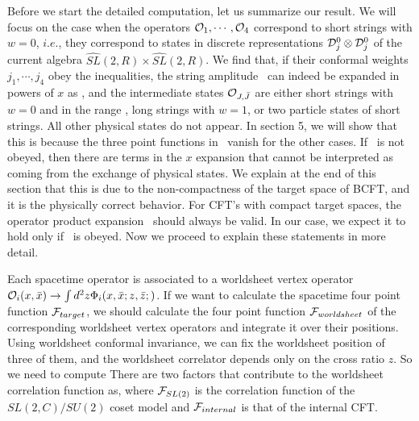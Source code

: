 Before we start the detailed computation, let us summarize our
result. We will focus on the case when the operators
${\cal O}_1, \cdots, {\cal O}_4$ correspond to short strings
with $w=0$, $i.e.$, they correspond to states
in discrete representations ${\cal D}_j^0
\otimes {\cal D}_j^0$ of the current algebra $\widehat{SL}(2,R)
\times \widehat{SL}(2,R)$.
We find that, if their conformal weights $j_1,\cdots,j_4$
obey the inequalities,
\eqn{}
the string amplitude \fourp\ can indeed be expanded in
powers of $x$ as
\formofc , and the intermediate states ${\cal O}_{J,\bar J}$
are either short strings with $w=0$ and in the range \range ,
 long strings with $w=1$,
or two particle states of short strings.
All other
physical states do not appear. In section 5, we
will show that this is  because the three point functions in
\formofc\ vanish for the other cases.
If \physcond\ is not obeyed, then there are terms
in the $x$ expansion that cannot be interpreted as coming from the
exchange of physical states. We explain at the end of this section
that this is due to  the non-compactness of the target space of BCFT,
and it is the physically correct behavior. For CFT's with
compact target spaces, the operator product expansion \formofc\
should always be valid. In our
case, we expect it to hold only if \physcond\ is obeyed.
Now we proceed to explain these statements in more detail.



Each spacetime operator is associated to a worldsheet
vertex operator
$ {\cal O}_i(x,\bar x)  \to  \int d^2 z \Phi_i( x, \bar x; z,\bar z;)$.
If we want to calculate the spacetime four point function ${\cal F}_{target}$,
we should calculate the four point function ${\cal F}_{worldsheet}$
of the corresponding
worldsheet vertex operators and integrate it over their positions.
Using worldsheet conformal invariance, we can fix the worldsheet
position of three of them, and the worldsheet correlator
depends only on the cross ratio $z$.
So we need to compute
\eqn{}
There are two factors that contribute to the worldsheet
correlation function as,
 \eqn\nnn{
{\cal F}_{worldsheet}(z,\bar z ; x , \bar x ) =
{\cal F}_{SL(2)}( z,\bar z ; x , \bar x) {\cal F}_{internal}(z,\bar
z),}
where ${\cal F}_{SL(2)}$ is the correlation function of
the $SL(2,C)/SU(2)$ coset model and ${\cal F}_{internal}$
is that of the internal CFT.


